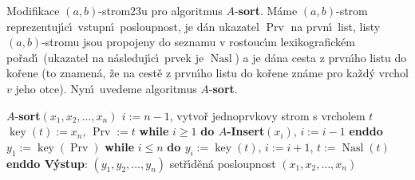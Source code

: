 \documentclass[a4paper,12pt]{article}
\DeclareMathOperator*{\Prv}{Prv}
\DeclareMathOperator*{\Nasl}{Nasl}
\DeclareMathOperator*{\key}{key}
\begin{document}
\flushpar Modifikace $(a,b)$-strom\accent23u pro algoritmus 
$A$-{\bf sort}. M\'ame $(a,b)$-strom reprezentuj\'\i c\'\i\ vstupn\'\i\ 
posloupnost, je d\'an ukazatel $\Prv$ na prvn\'\i\ list, listy 
$(a,b)$-stromu jsou propojeny do seznamu v rostouc\'\i m 
lexikografick\'em po\v rad\'\i\ (ukazatel na n\'asleduj\'\i c\'\i\ prvek je 
$\Nasl$) a je d\'ana cesta z prvn\'\i ho listu do ko\v rene (to 
znamen\'a, \v ze na cest\v e z prvn\'\i ho listu do ko\v rene zn\'ame 
pro ka\v zd\'y vrchol $v$ jeho otce). Nyn\'\i\ uvedeme algoritmus 
$A$-{\bf sort}. 
\bigskip

$A$-{\bf sort$(x_1,x_2,\dots,x_n)$\newline 
$i:=n-1$}, vytvo\v r jednoprvkovy strom s vrcholem $t$\newline 
$\key(t):=x_n$, $\Prv:=t$\newline 
{\bf while} $i\ge 1$ {\bf do $A$-Insert$(x_i)$}, $i:=i-1$ {\bf enddo}\newline 
$y_1:=\key(\Prv)$\newline 
{\bf while} $i\le n$ {\bf do\newline 
\phantom{---}$y_i:=\key(t)$}, $i:=i+1$, $t:=\Nasl(t)$\newline 
{\bf enddo\newline 
V\'ystup}: $(y_1,y_2,\dots,y_n)$ set\v r\'\i d\v en\'a posloupnost $
(x_1,x_2,\dots,x_n)$
\medskip
\end{document}
